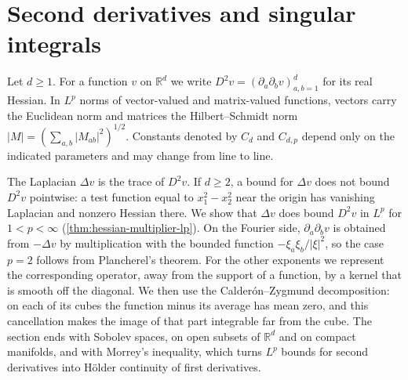 \section{Second derivatives and singular integrals}
\label{sec:hessian-singular-integrals}

Let $d\geq1$. For a function $v$ on $\mathbb R^d$ we write $D^2v=(\partial_a\partial_bv)_{a,b=1}^d$ for its real Hessian. In $L^p$ norms of vector-valued and matrix-valued functions, vectors carry the Euclidean norm and matrices the Hilbert--Schmidt norm $|M|=(\sum_{a,b}|M_{ab}|^2)^{1/2}$. Constants denoted by $C_d$ and $C_{d,p}$ depend only on the indicated parameters and may change from line to line.

The Laplacian $\Delta v$ is the trace of $D^2v$. If $d\geq2$, a bound for $\Delta v$ does not bound $D^2v$ pointwise: a test function equal to $x_1^2-x_2^2$ near the origin has vanishing Laplacian and nonzero Hessian there. We show that $\Delta v$ does bound $D^2v$ in $L^p$ for $1<p<\infty$ (\cref{thm:hessian-multiplier-lp}). On the Fourier side, $\partial_a\partial_bv$ is obtained from $-\Delta v$ by multiplication with the bounded function $-\xi_a\xi_b/|\xi|^2$, so the case $p=2$ follows from Plancherel's theorem. For the other exponents we represent the corresponding operator, away from the support of a function, by a kernel that is smooth off the diagonal. We then use the Calder\'on--Zygmund decomposition: on each of its cubes the function minus its average has mean zero, and this cancellation makes the image of that part integrable far from the cube. The section ends with Sobolev spaces, on open subsets of $\mathbb R^d$ and on compact manifolds, and with Morrey's inequality, which turns $L^p$ bounds for second derivatives into H\"older continuity of first derivatives.

